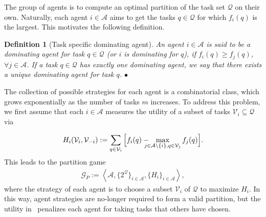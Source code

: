 \documentclass{IEEEtran}
\newcommand{\ldef}{:=}
\newcommand{\Mcal}[1]{\mathcal{#1}}
\newcommand{\Mc}[1]{\mathcal{#1}}
\newcommand{\thmtitle}[1]{\mbox{}\emph{(#1).}}
\newtheorem{define}[theorem]{Definition}
\newcommand{\bulletsym}{\hbox{$\bullet$}}
\newcommand{\bulletend}{\relax\ifmmode\else\unskip\hfill\fi\bulletsym}
\newcommand{\marginn}[1]{\marginpar{\color{blue}\tiny\ttfamily#1}}
\newcommand{\margin}[1]{\marginpar{\color{magenta}\tiny\ttfamily#1}}
\def \agt{\Mcal{A}}
\def \alloc{\Mcal{V}}
\def \game{\mathscr{G}}
\def \tsk{\Mc{Q}}
\begin{document}
The group of agents is to compute an optimal partition of the task set
$\tsk$ on their own. Naturally, each agent $i \in \agt$ aims to get
the tasks $q\in \tsk$ for which $f_i(q)$ is the largest. This
motivates the following definition. 
\begin{define}[Task specific dominating agent] \label{def:dominating_agent} 
    An agent $i \in \agt$ is said to be a \emph{dominating
    agent for task $q \in \tsk$} (or $i$ \emph{is dominating for} $q$), if $f_i(q) \geq f_j(q)$,
  $\forall j \in \agt$.  If a task $q \in \tsk$ has exactly one
  dominating agent, we say that there exists a \emph{unique dominating
    agent for task $q$}.  \bulletend
\end{define}
 The collection of possible strategies for each agent is a combinatorial class, which
grows exponentially as the number of tasks $m$ increases. To address this problem, 
we first assume that each $i \in \agt$ 
measures the utility of a subset of tasks $
\alloc_i \subseteq \tsk$ via

\vspace{-.3cm}
\begin{align}
	H_i(\alloc_i,\alloc_{-i}) \ldef \sum_{q \in \alloc_i} \Big[ f_i(q) - \hspace{-2ex} \max_{j \in \agt \setminus \{i\}, q \in \alloc_j} f_j(q) \Big].
	\label{eq:agent_reward_partn} 
\end{align}
This leads to the partition
game
\begin{align*}
	\game_P \ldef {\left<\agt,\{2^{\tsk}\}_{i\in \agt}, \{H_i\}_{i \in \agt} \right>},
\end{align*}
where the strategy of each agent is to choose a subset $\alloc_i$ of
$\tsk$ to maximize $H_i$. In this way, 
agent strategies are no-longer required to form a valid partition,
but the utility in~ penalizes each agent for
taking tasks that others have chosen.
\end{document}
